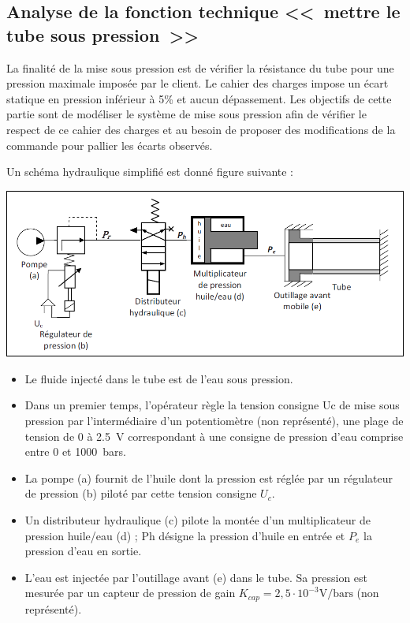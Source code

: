 \documentclass[10pt,fleqn]{article} %
\begin{document}
\begin{multicols}{2}
\section*{Analyse de la fonction technique <<~mettre le tube sous pression~>>}

La finalité de la mise sous pression est de vérifier la résistance du tube pour une pression maximale imposée par le client. Le cahier des charges impose un écart statique en pression inférieur à 5\% et aucun dépassement. 
Les objectifs de cette partie sont de modéliser le système de mise sous pression afin de vérifier le respect de ce cahier des charges et au besoin de proposer des modifications de la commande pour pallier les écarts observés.

Un schéma hydraulique simplifié est donné figure suivante :
\begin{center}
\includegraphics[width=\linewidth]{images_02/fig_01}
\end{center}


\begin{itemize}
\item Le fluide injecté dans le tube est de l’eau sous pression.
\item Dans un premier temps, l’opérateur règle la tension consigne Uc de mise sous pression par l’intermédiaire d’un potentiomètre (non représenté), une plage de tension de 0 à \SI{2,5}{V} correspondant à une consigne de pression d’eau comprise entre 0 et \SI{1000}{bars}.
\item La pompe (a) fournit de l’huile dont la pression est réglée par un régulateur de pression (b) piloté par cette tension consigne $U_c$.
\item Un distributeur hydraulique (c) pilote la montée d’un multiplicateur de pression huile/eau (d) ;
Ph désigne la pression d’huile en entrée et $P_e$ la  pression d’eau en sortie.
\item L’eau est injectée par l’outillage avant (e) dans le tube. Sa pression est mesurée par un capteur de pression de gain $K_{cap} = 2,5\cdot 10^{-3} \text{V/bars}$  (non représenté).
\end{itemize}


\end{multicols}
\end{document}
